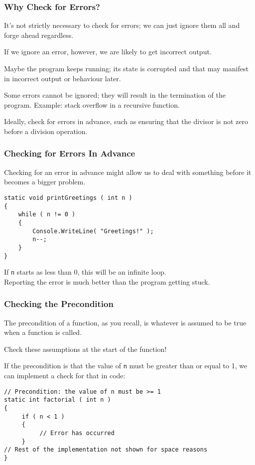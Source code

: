 \begin{frame}
\frametitle{Why Check for Errors?}

It's not strictly necessary to check for errors; we can just ignore them all and forge ahead regardless.

If we ignore an error, however, we are likely to get incorrect output. 

Maybe the program keeps running; its state is corrupted and that may manifest in incorrect output or behaviour later.

Some errors cannot be ignored; they will result in the termination of the program. Example: stack overflow in a recursive function.

Ideally, check for errors in advance, such as ensuring that the divisor is not zero before a division operation.


\end{frame}

\begin{frame}[fragile]
\frametitle{Checking for Errors In Advance}

Checking for an error in advance might allow us to deal with something before it becomes a bigger problem.

\begin{verbatim}
static void printGreetings ( int n )
{
    while ( n != 0 )
    {
        Console.WriteLine( "Greetings!" );
        n--;
    }
}
\end{verbatim}
If \texttt{n} starts as less than 0, this will be an infinite loop.\\
\quad Reporting the error is much better than the program getting stuck.


\end{frame}

\begin{frame}[fragile]
\frametitle{Checking the Precondition}
The precondition of a function, as you recall, is whatever is assumed to be true when a function is called.

Check these assumptions at the start of the function!

If the precondition is that the value of \texttt{n} must be greater than or equal to 1, we can implement a check for that in code:

\begin{verbatim}
// Precondition: the value of n must be >= 1
static int factorial ( int n )
{
     if ( n < 1 )
     {
          // Error has occurred
     }
// Rest of the implementation not shown for space reasons
}
\end{verbatim}

\end{frame}

